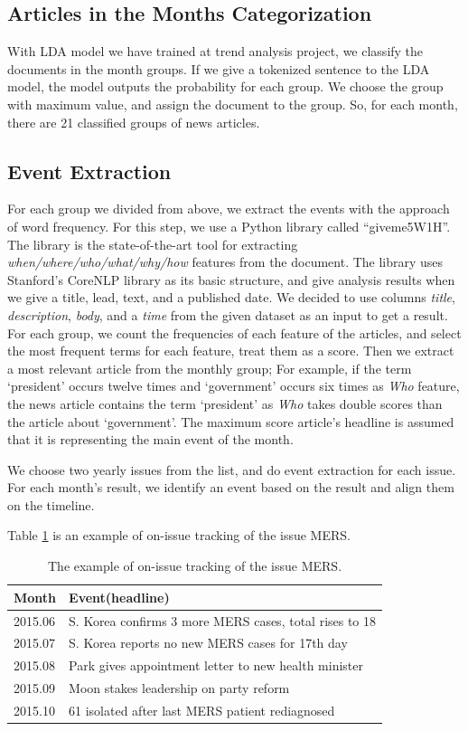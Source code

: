 \subsection{Articles in the Months Categorization}

With LDA model we have trained at trend analysis project,
we classify the documents in the month groups.
If we give a tokenized sentence to the LDA model,
the model outputs the probability for each group.
We choose the group with maximum value, and assign the document to the group.
So, for each month, there are 21 classified groups of news articles.

\subsection{Event Extraction}

For each group we divided from above,
we extract the events with the approach of word frequency.
For this step, we use a Python library called ``giveme5W1H''\cite{Hamborg2019b}.
The library is the state-of-the-art tool for extracting
\textit{when/where/who/what/why/how} features from the document.
The library uses Stanford's CoreNLP library as its basic structure,
and give analysis results when we give a
title, lead, text, and a published date.
We decided to use columns \textit{title}, \textit{description}, \textit{body}, and a \textit{time}
from the given dataset as an input to get a result.
For each group, we count the frequencies of each feature of the articles,
and select the most frequent terms for each feature, treat them as a score.
Then we extract a most relevant article from the monthly group;
For example, if the term `president' occurs twelve times and
`government' occurs six times as \textit{Who} feature,
the news article contains the term `president' as \textit{Who}
takes double scores than the article about `government'.
The maximum score article's headline is assumed that it is
representing the main event of the month.

We choose two yearly issues from the list, and do event extraction for each issue.
For each month's result, we identify an event based on the result and align them on the timeline.

Table \ref{table:onissue} is an example of on-issue tracking of the issue MERS.

\begin{table}[!htbp]
  \begin{tabular}{l|l}
  Month   & Event(headline)                                        \\ \hline
  2015.06 & S. Korea confirms 3 more MERS cases, total rises to 18 \\
  2015.07 & S. Korea reports no new MERS cases for 17th day        \\
  2015.08 & Park gives appointment letter to new health minister   \\
  2015.09 & Moon stakes leadership on party reform                 \\
  2015.10 & 61 isolated after last MERS patient rediagnosed       
  \end{tabular}
  \caption{The example of on-issue tracking of the issue MERS.}
  \label{table:onissue}
\end{table}
